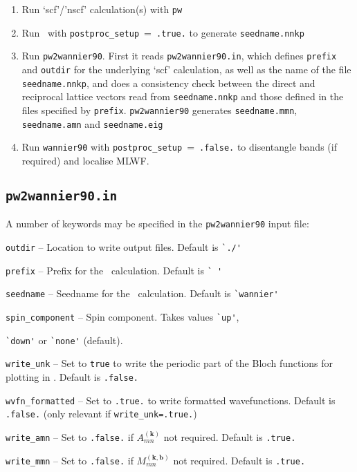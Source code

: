 \begin{enumerate}
\item Run `scf'/'nscf' calculation(s) with \verb#pw#
\item Run \wannier\ with \verb#postproc_setup#~=~\verb#.true.# to
  generate \verb#seedname.nnkp#
\item Run {\tt pw2wannier90}. First it reads \verb#pw2wannier90.in#,
  which defines \verb#prefix# and \verb#outdir# for the underlying `scf'
  calculation, as well as the name of the file \verb#seedname.nnkp#,
  and does a consistency check between the direct and reciprocal lattice
  vectors read from \verb#seedname.nnkp# and those defined in the
  files specified by \verb#prefix#. \verb#pw2wannier90# generates
  \verb#seedname.mmn#, \verb#seedname.amn# and \verb#seedname.eig#
\item Run \verb#wannier90# with \verb#postproc_setup#~=~\verb#.false.# to
  disentangle bands (if required) and localise MLWF.
\end{enumerate}

\subsection{{\tt pw2wannier90.in}}

A number of keywords may be specified in the {\tt pw2wannier90} input file:

   \verb#outdir# -- Location to write output files. Default is \verb#`./'#

   \verb#prefix# -- Prefix for the \pwscf\ calculation. Default is \verb#` '#

   \verb#seedname# -- Seedname for the \wannier\ calculation. Default
   is \verb#`wannier'#

   \verb#spin_component# -- Spin component. Takes values \verb#`up'#,

   \verb#`down'# or \verb#`none'# (default).


   \verb#write_unk# -- Set to \verb#true# to write the periodic part
   of the Bloch functions for plotting in \wannier. Default is
   \verb#.false.#

   \verb#wvfn_formatted# -- Set to \verb#.true.# to write formatted
   wavefunctions. Default is \verb#.false.# (only relevant if
   \verb#write_unk=.true.#)

   \verb#write_amn# -- Set to \verb#.false.# if
   $A_{mn}^{(\mathbf{k})}$ not required. Default is \verb#.true.#

   \verb#write_mmn# -- Set to \verb#.false.# if
   $M_{mn}^{(\mathbf{k,b})}$ not required. Default is \verb#.true.#
